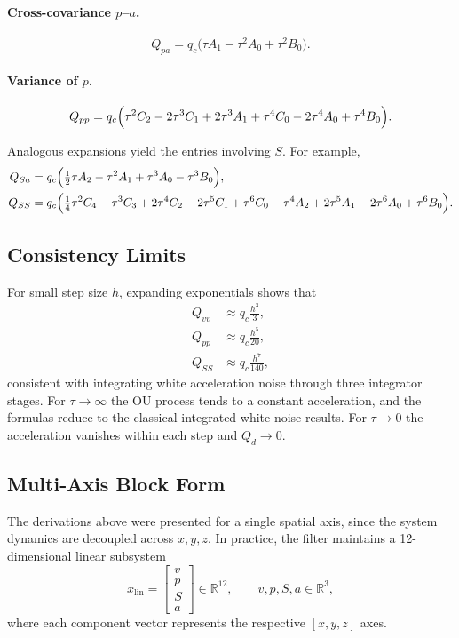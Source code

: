\documentclass[10pt]{extarticle}
\begin{document}
\paragraph{Cross-covariance $p$--$a$.}
\begin{equation}
Q_{pa} = q_c \bigl( \tau A_1 - \tau^2 A_0 + \tau^2 B_0 \bigr).
\end{equation}

\paragraph{Variance of $p$.}
\begin{equation}
Q_{pp} = q_c \Bigl( \tau^2 C_2 - 2\tau^3 C_1 + 2\tau^3 A_1
+ \tau^4 C_0 - 2\tau^4 A_0 + \tau^4 B_0 \Bigr).
\end{equation}

Analogous expansions yield the entries involving $S$. For example,
\begin{align}
Q_{Sa} &= q_c \Bigl( \tfrac{1}{2}\tau A_2 - \tau^2 A_1 + \tau^3 A_0 - \tau^3 B_0 \Bigr), \\
Q_{SS} &= q_c \Bigl( \tfrac{1}{4}\tau^2 C_4 - \tau^3 C_3 + 2\tau^4 C_2
 - 2\tau^5 C_1 + \tau^6 C_0 - \tau^4 A_2 + 2\tau^5 A_1
 - 2\tau^6 A_0 + \tau^6 B_0 \Bigr).
\end{align}

\subsection{Consistency Limits}

For small step size $h$, expanding exponentials shows that
\begin{align}
Q_{vv} &\approx q_c \frac{h^3}{3}, \\
Q_{pp} &\approx q_c \frac{h^5}{20}, \\
Q_{SS} &\approx q_c \frac{h^7}{140},
\end{align}
consistent with integrating white acceleration noise through three
integrator stages. For $\tau \to \infty$ the OU process tends to a
constant acceleration, and the formulas reduce to the classical
integrated white-noise results. For $\tau \to 0$ the acceleration
vanishes within each step and $Q_d \to 0$.

\subsection{Multi-Axis Block Form}

The derivations above were presented for a single spatial axis, since the
system dynamics are decoupled across $x,y,z$. In practice, the filter
maintains a 12-dimensional linear subsystem
%
\[
x_{\mathrm{lin}} =
\begin{bmatrix}
v \\ p \\ S \\ a
\end{bmatrix}
\in \mathbb{R}^{12}, \qquad
v,p,S,a \in \mathbb{R}^3,
\]
%
where each component vector represents the respective $[x,y,z]$ axes.
\end{document}
